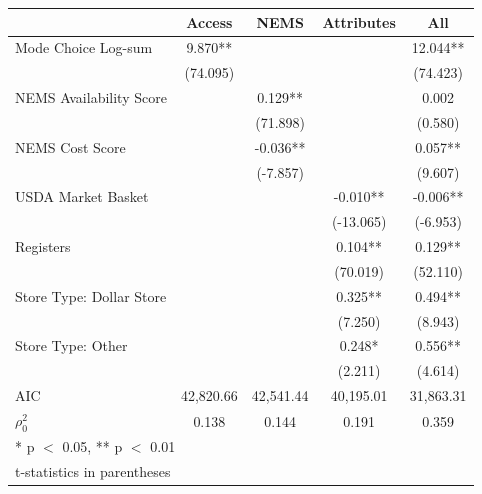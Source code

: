 \documentclass[
  letterpaper,
  number,
  review,
  3p]{elsarticle}
\providecommand{\DIFaddendFL}{} %
\DeclareRobustCommand{\DIFaddendFL}{\DIFOaddendFL \let\includegraphics\DIFOincludegraphics} %
\begin{document}
\begin{table}
{\centering
\begin{tabular}[t]{lcccc}
\toprule
  & Access & NEMS & Attributes & All\\
\midrule
Mode Choice Log-sum & 9.870** &  &  & 12.044**\\
 & (74.095) &  &  & (74.423)\\
NEMS Availability Score &  & 0.129** &  & 0.002\\
 &  & (71.898) &  & (0.580)\\
NEMS Cost Score &  & -0.036** &  & 0.057**\\
 &  & (-7.857) &  & (9.607)\\
USDA Market Basket &  &  & -0.010** & -0.006**\\
 &  &  & (-13.065) & (-6.953)\\
Registers &  &  & 0.104** & 0.129**\\
 &  &  & (70.019) & (52.110)\\
Store Type: Dollar Store &  &  & 0.325** & 0.494**\\
 &  &  & (7.250) & (8.943)\\
Store Type: Other &  &  & 0.248* & 0.556**\\
 &  &  & (2.211) & (4.614)\\
\midrule
AIC & 42,820.66 & 42,541.44 & 40,195.01 & 31,863.31\\
$\rho_0^2$ & 0.138 & 0.144 & 0.191 & 0.359\\
\bottomrule
\multicolumn{5}{l}{\rule{0pt}{1em}* p $<$ 0.05, ** p $<$ 0.01}\\
\multicolumn{5}{l}{\rule{0pt}{1em}t-statistics in parentheses}\\
\end{tabular}

}
\DIFaddendFL 

\end{table}%
\end{document}
